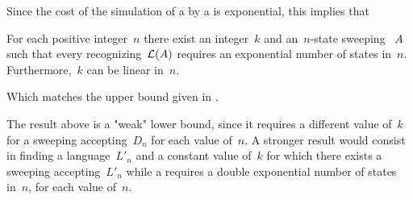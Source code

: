 Since the cost of the simulation of a \ONFA by a \ODFA is exponential, this implies that

\begin{coro}
	For each positive integer~$n$ there exist an integer~$k$ and an~$n$-state sweeping \kDLA~$A$ such that every \ONFA recognizing~$\mathcal L(A)$ requires an exponential number of states in~$n$.
	Furthermore,~$k$ can be linear in~$n$.
\end{coro}

Which matches the upper bound given in .

The result above is a "weak" lower bound, since it requires a different value of~$k$ for a sweeping \kDLA accepting~$D_n$ for each value of~$n$.
A stronger result would consist in finding a language~$L'_n$ and a constant value of~$k$ for which there exists a sweeping \kDLA accepting~$L'_n$ while a \ODFA requires a double exponential number of states in~$n$, for each value of~$n$.
